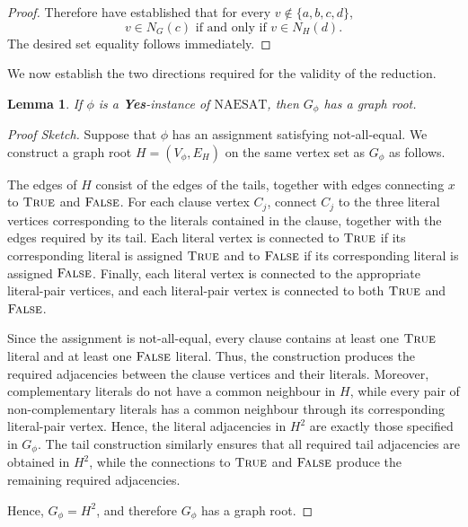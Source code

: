 \documentclass[11pt]{report}
\newtheorem{lemma}{Lemma}
\begin{document}
\begin{proof}
  Therefore have established that for every $v\notin\{a,b,c,d\}$,
  \[
  v \in N_G(c) \text{ if and only if } v \in N_H(d).
  \]
  The desired set equality follows immediately.
\end{proof}

We now establish the two directions required for the validity of the reduction.

\begin{lemma} \label{lemma::np_complete_forward}
  If $\phi$ is a \textbf{Yes}-instance of $\mathrm{NAESAT}$, then $G_\phi$ has a graph root.
\end{lemma}
\begin{proof}[Proof Sketch]
  Suppose that $\phi$ has an assignment satisfying not-all-equal. We construct a graph root $H=(V_\phi,E_H)$ on the same vertex set as $G_\phi$ as follows.

  The edges of $H$ consist of the edges of the tails, together with edges connecting $x$ to $\textsc{True}$ and $\textsc{False}$. For each clause vertex $C_j$, connect $C_j$ to the three literal vertices corresponding to the literals contained in the clause, together with the edges required by its tail. Each literal vertex is connected to $\textsc{True}$ if its corresponding literal is assigned $\textsc{True}$ and to $\textsc{False}$ if its corresponding literal is assigned $\textsc{False}$. Finally, each literal vertex is connected to the appropriate literal-pair vertices, and each literal-pair vertex is connected to both $\textsc{True}$ and $\textsc{False}$.

  Since the assignment is not-all-equal, every clause contains at least one $\textsc{True}$ literal and at least one $\textsc{False}$ literal. Thus, the construction produces the required adjacencies between the clause vertices and their literals. Moreover, complementary literals do not have a common neighbour in $H$, while every pair of non-complementary literals has a common neighbour through its corresponding literal-pair vertex. Hence, the literal adjacencies in $H^2$ are exactly those specified in $G_\phi$. The tail construction similarly ensures that all required tail adjacencies are obtained in $H^2$, while the connections to $\textsc{True}$ and $\textsc{False}$ produce the remaining required adjacencies.

  Hence, $G_\phi=H^2$, and therefore $G_\phi$ has a graph root.
\end{proof}
\end{document}
